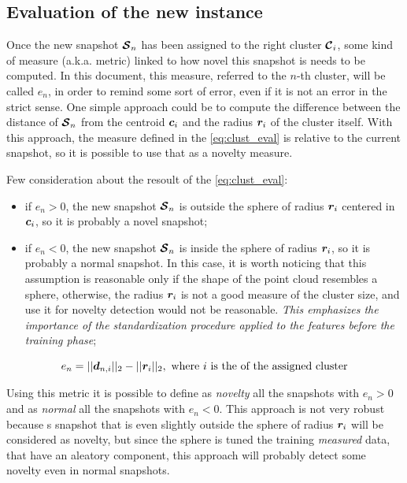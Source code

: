 \subsection{Evaluation of the new instance}
Once the new snapshot $\bm{\mathcal{S}}_n$ has been assigned to the right cluster $\bm{\mathcal{C}}_i$, some kind of measure (a.k.a. metric) linked to how novel this snapshot is needs to be computed. In this document, this measure, referred to the $n$-th cluster, will be called $e_n$, in order to remind some sort of error, even if it is not an error in the strict sense. One simple approach could be to compute the difference between the distance of $\bm{\mathcal{S}}_n$ from the centroid $\bm{c}_i$ and the radius $\bm{r}_i$ of the cluster itself. With this approach, the measure defined in the \autoref{eq:clust_eval} is relative to the current snapshot, so it is possible to use that as a novelty measure.

Few consideration about the resoult of the \autoref{eq:clust_eval}:
\begin{itemize}
  \item if $e_{n} > 0$, the new snapshot $\bm{\mathcal{S}}_n$ is outside the sphere of radius $\bm{r}_i$ centered in $\bm{c}_i$, so it is probably a novel snapshot;
  \item if $e_{n} < 0$, the new snapshot $\bm{\mathcal{S}}_n$ is inside the sphere of radius $\bm{r}_i$, so it is probably a normal snapshot. In this case, it is worth noticing that this assumption is reasonable only if the shape of the point cloud resembles a sphere, otherwise, the radius $\bm{r}_i$ is not a good measure of the cluster size, and use it for novelty detection would not be reasonable. \emph{This emphasizes the importance of the standardization procedure applied to the features before the training phase};
\end{itemize}

\begin{equation}
  \label{eq:clust_eval}
  e_{n} = ||\bm{d}_{n,i}||_2 - ||\bm{r}_{i}||_2, \text{ where $i$ is the of the assigned cluster}
\end{equation}

Using this metric it is possible to define as \emph{novelty} all the snapshots with $e_{n} > 0$ and as \emph{normal} all the snapshots with $e_{n} < 0$. This approach is not very robust because s snapshot that is even slightly outside the sphere of radius $\bm{r}_i$ will be considered as novelty, but since the sphere is tuned the training \emph{measured} data, that have an aleatory component, this approach will probably detect some novelty even in normal snapshots.

